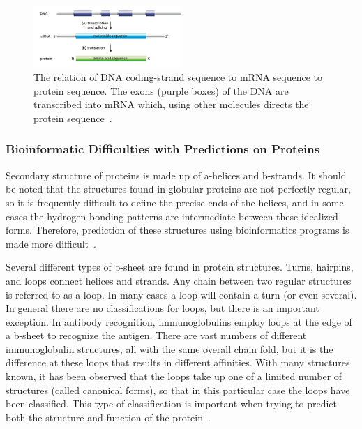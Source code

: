 \documentclass{report}
\begin{document}
\begin{figure}[H]
    \centering
    \includegraphics[width=0.5\textwidth]{Transcription and translation.png}
    \caption{\label{fig:Transcription and translation}The relation of DNA coding-strand sequence to mRNA sequence to protein sequence. The exons (purple boxes) of the DNA are transcribed into mRNA which, using other molecules directs the protein sequence~\cite{zvelebil_understanding_2008}.}
\end{figure}

\subsubsection{Bioinformatic Difficulties with Predictions on Proteins}

Secondary structure of proteins is made up of a-helices and b-strands. It should be noted that the structures found in globular proteins are not perfectly regular, so it is frequently difficult to define the precise ends of the helices, and in some cases the hydrogen-bonding patterns are intermediate between these idealized forms. Therefore, prediction of these structures using bioinformatics programs is made more difficult~\cite{zvelebil_understanding_2008}.

Several different types of b-sheet are found in protein structures. Turns, hairpins, and loops connect helices and strands. Any chain between two regular structures is referred to as a loop. In many cases a loop will contain a turn (or even several). In general there are no classifications for loops, but there is an important exception. In antibody recognition, immunoglobulins employ loops at the edge of a b-sheet to recognize the antigen. There are vast numbers of different immunoglobulin structures, all with the same overall chain fold, but it is the difference at these loops that results in different affinities. With many structures known, it has been observed that the loops take up one of a limited number of structures (called canonical forms), so that in this particular case the loops have been classified. This type of classification is important when trying to predict both the structure and function of the protein~\cite{zvelebil_understanding_2008}.
\end{document}
